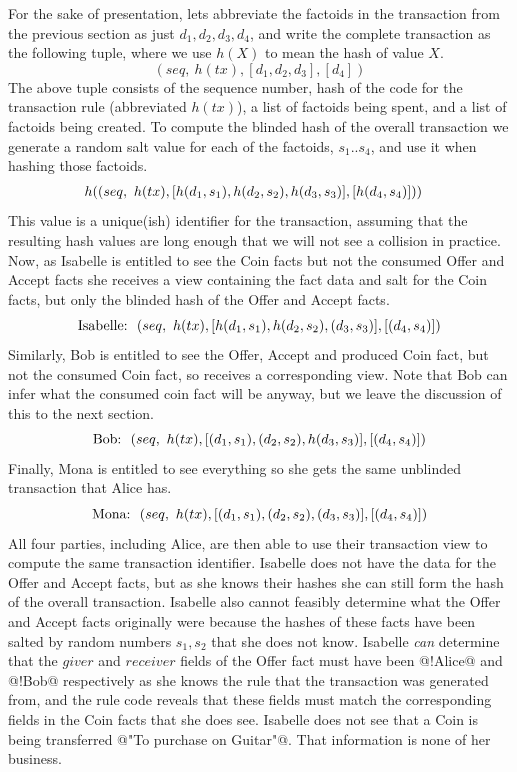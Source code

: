 For the sake of presentation, lets abbreviate the factoids in the transaction from the previous section as just $d_1, d_2, d_3, d_4$, and write the complete transaction as the following tuple, where we use $h(X)$ to mean the hash of value $X$.
$$
 (seq,~ h(tx), [d_1, d_2, d_3], [d_4])
$$
The above tuple consists of the sequence number, hash of the code for the transaction rule (abbreviated $h(tx)$), a list of factoids being spent, and a list of factoids being created. To compute the blinded hash of the overall transaction we generate a random salt value for each of the factoids, $s_1 .. s_4$, and use it when hashing those factoids.
$$
\begin{array}{rl}
 \hspace{-2ex} h((seq,~ h(tx), [h(d_1, s_1), h(d_2, s_2), h(d_3, s_3)], [h(d_4, s_4)]))
\end{array}
$$
This value is a unique(ish) identifier for the transaction, assuming that the resulting hash values are long enough that we will not see a collision in practice. Now, as Isabelle is entitled to see the Coin facts but not the consumed Offer and Accept facts she receives a view containing the fact data and salt for the Coin facts, but only the blinded hash of the Offer and Accept facts.
$$
\textrm{Isabelle:}~~(seq,~ h(tx), [h(d_1, s_1), h(d_2, s_2), (d_3, s_3)], [(d_4, s_4)])
$$
Similarly, Bob is entitled to see the Offer, Accept and produced Coin fact, but not the consumed Coin fact, so receives a corresponding view. Note that Bob can infer what the consumed coin fact will be anyway, but we leave the discussion of this to the next section.
$$
\textrm{Bob:}~~(seq,~ h(tx), [(d_1, s_1), (d_2, s_2), h(d_3, s_3)], [(d_4, s_4)])
$$
Finally, Mona is entitled to see everything so she gets the same unblinded transaction that Alice has.
$$
\textrm{Mona:}~~(seq,~ h(tx), [(d_1, s_1), (d_2, s_2), (d_3, s_3)], [(d_4, s_4)])
$$
All four parties, including Alice, are then able to use their transaction view to compute the same transaction identifier. Isabelle does not have the data for the Offer and Accept facts, but as she knows their hashes she can still form the hash of the overall transaction. Isabelle also cannot feasibly determine what the Offer and Accept facts originally were because the hashes of these facts have been salted by random numbers $s_1, s_2$ that she does not know. Isabelle \emph{can} determine that the $giver$ and $receiver$ fields of the Offer fact must have been @!Alice@ and @!Bob@ respectively as she knows the rule that the transaction was generated from, and the rule code reveals that these fields must match the corresponding fields in the Coin facts that she does see. Isabelle does not see that a Coin is being transferred @"To purchase on Guitar"@. That information is none of her business.


